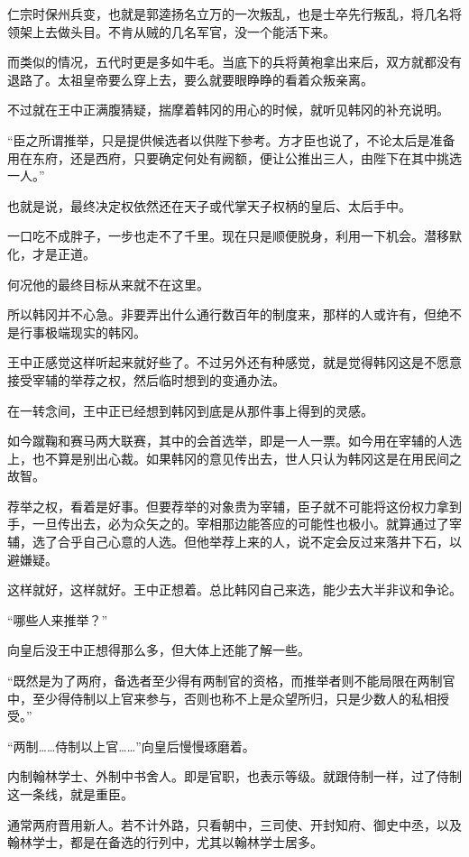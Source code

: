仁宗时保州兵变，也就是郭逵扬名立万的一次叛乱，也是士卒先行叛乱，将几名将领架上去做头目。不肯从贼的几名军官，没一个能活下来。

而类似的情况，五代时更是多如牛毛。当底下的兵将黄袍拿出来后，双方就都没有退路了。太祖皇帝要么穿上去，要么就要眼睁睁的看着众叛亲离。

不过就在王中正满腹猜疑，揣摩着韩冈的用心的时候，就听见韩冈的补充说明。

“臣之所谓推举，只是提供候选者以供陛下参考。方才臣也说了，不论太后是准备用在东府，还是西府，只要确定何处有阙额，便让公推出三人，由陛下在其中挑选一人。”

也就是说，最终决定权依然还在天子或代掌天子权柄的皇后、太后手中。

一口吃不成胖子，一步也走不了千里。现在只是顺便脱身，利用一下机会。潜移默化，才是正道。

何况他的最终目标从来就不在这里。

所以韩冈并不心急。非要弄出什么通行数百年的制度来，那样的人或许有，但绝不是行事极端现实的韩冈。

王中正感觉这样听起来就好些了。不过另外还有种感觉，就是觉得韩冈这是不愿意接受宰辅的举荐之权，然后临时想到的变通办法。

在一转念间，王中正已经想到韩冈到底是从那件事上得到的灵感。

如今蹴鞠和赛马两大联赛，其中的会首选举，即是一人一票。如今用在宰辅的人选上，也不算是别出心裁。如果韩冈的意见传出去，世人只认为韩冈这是在用民间之故智。

荐举之权，看着是好事。但要荐举的对象贵为宰辅，臣子就不可能将这份权力拿到手，一旦传出去，必为众矢之的。宰相那边能答应的可能性也极小。就算通过了宰辅，选了合乎自己心意的人选。但他举荐上来的人，说不定会反过来落井下石，以避嫌疑。

这样就好，这样就好。王中正想着。总比韩冈自己来选，能少去大半非议和争论。

“哪些人来推举？”

向皇后没王中正想得那么多，但大体上还能了解一些。

“既然是为了两府，备选者至少得有两制官的资格，而推举者则不能局限在两制官中，至少得侍制以上官来参与，否则也称不上是众望所归，只是少数人的私相授受。”

“两制……侍制以上官……”向皇后慢慢琢磨着。

内制翰林学士、外制中书舍人。即是官职，也表示等级。就跟侍制一样，过了侍制这一条线，就是重臣。

通常两府晋用新人。若不计外路，只看朝中，三司使、开封知府、御史中丞，以及翰林学士，都是在备选的行列中，尤其以翰林学士居多。

